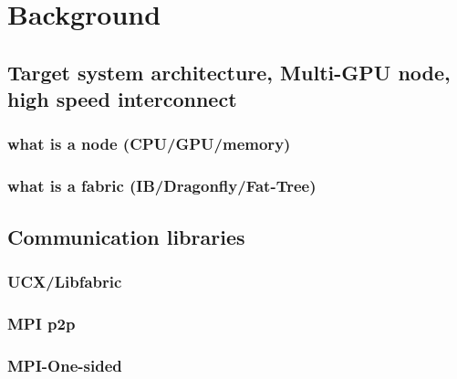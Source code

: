 
\glsresetall %
\chapter[Background]{Background}\label{ch:Background}


    \section{Target system architecture, Multi-GPU node, high speed interconnect}
        \subsection{what is a node (CPU/GPU/memory)}
        \subsection{what is a fabric (IB/Dragonfly/Fat-Tree)}
    \section{Communication libraries} 
    \cite{mpi40, gabriel2004OpenMPI, MPICH, shamis2015ucx}
        \subsection{UCX/Libfabric}
        \subsection{MPI p2p}
        \subsection{MPI-One-sided}
